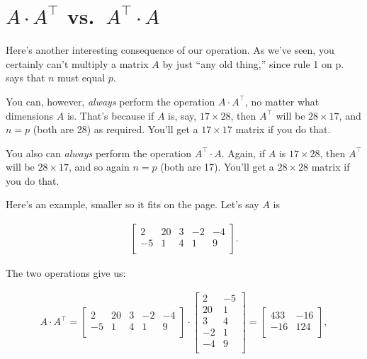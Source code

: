 \section{$A\cdot A^\intercal$ vs.~$A^\intercal \cdot A$} 


Here's another interesting consequence of our operation. As we've seen, you
certainly can't multiply a matrix $A$ by just ``any old thing,'' since rule 1
on p.~\pageref{matMultRules} says that $n$ must equal $p$.

You can, however, \textit{always} perform the operation $A\cdot A^\intercal$,
no matter what dimensions $A$ is. That's because if $A$ is, say, $17\times 28$,
then $A^\intercal$ will be $28\times 17$, and $n=p$ (both are 28) as required.
You'll get a $17\times 17$ matrix if you do that.

You also can \textit{always} perform the operation $A^\intercal \cdot A$.
Again, if $A$ is $17\times 28$, then $A^\intercal$ will be $28\times 17$, and
so again $n=p$ (both are 17). You'll get a $28\times 28$ matrix if you do that.

Here's an example, smaller so it fits on the page. Let's say $A$ is

\vspace{-.15in}
\begin{align*}
\begin{bmatrix}
2 & 20 & 3 & -2 & -4 \\
-5 & 1 & 4 & 1 & 9 \\
\end{bmatrix}.
\end{align*}
\vspace{-.15in}

The two operations give us:

\vspace{-.15in}
\begin{align*}
A\cdot A^\intercal = 
\begin{bmatrix}
2 & 20 & 3 & -2 & -4 \\
-5 & 1 & 4 & 1 & 9 \\
\end{bmatrix} \cdot
\begin{bmatrix}
2 & -5 \\
20 & 1 \\
3 & 4 \\
-2 & 1 \\
-4 & 9 \\
\end{bmatrix}  =
\begin{bmatrix}
433 & -16 \\
-16 & 124 \\
\end{bmatrix},
\end{align*}
\vspace{-.15in}

